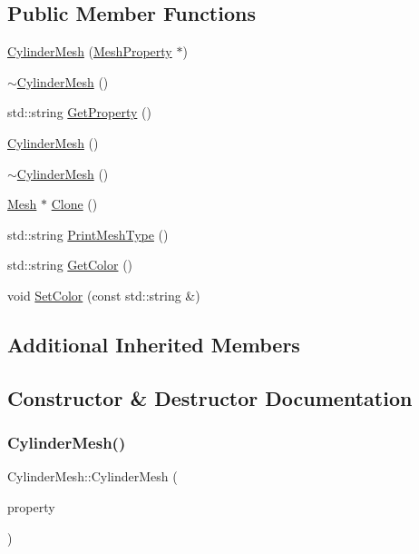 \subsection*{Public Member Functions}
\begin{DoxyCompactItemize}
\item 
\mbox{\hyperlink{class_cylinder_mesh_ac707820688dc9d97a7acfeb1f475b705}{Cylinder\+Mesh}} (\mbox{\hyperlink{class_mesh_property}{Mesh\+Property}} $\ast$)
\item 
\mbox{\hyperlink{class_cylinder_mesh_a0da5f97347f977bd0783f6674db3cba0}{$\sim$\+Cylinder\+Mesh}} ()
\item 
std\+::string \mbox{\hyperlink{class_cylinder_mesh_a508ae2bf6117bc949b05d8b99b8aad34}{Get\+Property}} ()
\item 
\mbox{\hyperlink{class_cylinder_mesh_a08927de34b86bf63103f8c3790ccf870}{Cylinder\+Mesh}} ()
\item 
\mbox{\hyperlink{class_cylinder_mesh_a0da5f97347f977bd0783f6674db3cba0}{$\sim$\+Cylinder\+Mesh}} ()
\item 
\mbox{\hyperlink{class_mesh}{Mesh}} $\ast$ \mbox{\hyperlink{class_cylinder_mesh_ad9e278dd523b06090b4e64f70a262575}{Clone}} ()
\item 
std\+::string \mbox{\hyperlink{class_cylinder_mesh_aa5edae04a31b3ccab1e051eba25781a7}{Print\+Mesh\+Type}} ()
\item 
std\+::string \mbox{\hyperlink{class_cylinder_mesh_a7415f90e56862321e09bcf6088a335a0}{Get\+Color}} ()
\item 
void \mbox{\hyperlink{class_cylinder_mesh_a892088bc6375fbee9a80b2022b05ea03}{Set\+Color}} (const std\+::string \&)
\end{DoxyCompactItemize}
\subsection*{Additional Inherited Members}


\subsection{Constructor \& Destructor Documentation}
\mbox{\label{class_cylinder_mesh_ac707820688dc9d97a7acfeb1f475b705}} 
\subsubsection{\texorpdfstring{CylinderMesh()}{CylinderMesh()}\hspace{0.1cm}{\footnotesize\ttfamily [1/2]}}
{\footnotesize\ttfamily Cylinder\+Mesh\+::\+Cylinder\+Mesh (\begin{DoxyParamCaption}\item[{\mbox{\hyperlink{class_mesh_property}{Mesh\+Property}} $\ast$}]{property }\end{DoxyParamCaption})}

